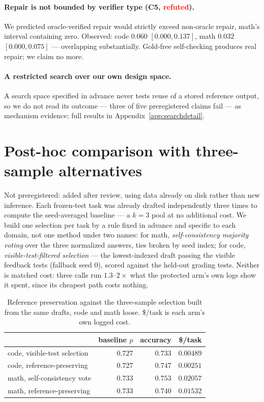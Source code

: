 \documentclass{article}
\begin{document}
\paragraph{Repair is not bounded by verifier type (C5,
\textcolor{red}{refuted}).} We predicted oracle-verified repair would strictly
exceed non-oracle repair, math's interval containing zero. Observed: code
$0.060$ $[0.000,0.137]$, math $0.032$ $[0.000,0.075]$ --- overlapping
substantially. Gold-free self-checking produces real repair; we claim no more.

\paragraph{A restricted search over our own design space.} A search space
specified in advance never tests reuse of a stored reference output, so we do
not read its outcome --- three of five preregistered claims fail --- as
mechanism evidence; full results in Appendix~\ref{app:searchdetail}.

\section{Post-hoc comparison with three-sample alternatives}
\label{sec:threesample}

Not preregistered: added after review, using data already on disk rather than
new inference. Each frozen-test task was already drafted independently three
times to compute the seed-averaged baseline --- a $k=3$ pool at no additional
cost. We build one selection per task by a rule fixed in advance and specific
to each domain, not one method under two names: for math,
\emph{self-consistency majority voting} over the three normalized answers,
ties broken by seed index; for code, \emph{visible-test-filtered selection}
--- the lowest-indexed draft passing the visible feedback tests (fallback seed
$0$), scored against the held-out grading tests. Neither is matched cost:
three calls run $1.3$--$2\times$ what the protected arm's own logs show it
spent, since its cheapest path costs nothing.

\begin{table}[t]
\centering
\small
\caption{Reference preservation against the three-sample selection built from
the same drafts, code and math loose. \$/task is each arm's own logged cost.}
\label{tab:bestof3}
\begin{tabular}{lrrr}
\toprule
& baseline $p$ & accuracy & \$/task \\
\midrule
code, visible-test selection & $0.727$ & $0.733$ & $0.00489$ \\
code, reference-preserving & $0.727$ & $0.747$ & $0.00251$ \\
math, self-consistency vote & $0.733$ & $0.753$ & $0.02057$ \\
math, reference-preserving & $0.733$ & $0.740$ & $0.01532$ \\
\bottomrule
\end{tabular}
\end{table}
\end{document}
